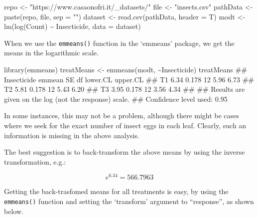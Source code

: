 \documentclass[a4paper,12pt,oneside]{book}
\newenvironment{Shaded}{\begin{snugshade}}{\end{snugshade}}
\newcommand{\SpecialCharTok}[1]{#1}
\newcommand{\StringTok}[1]{#1}
\newcommand{\DocumentationTok}[1]{#1}
\newcommand{\OtherTok}[1]{#1}
\newcommand{\FunctionTok}[1]{#1}
\newcommand{\AttributeTok}[1]{#1}
\newcommand{\NormalTok}[1]{#1}
\begin{document}
\begin{Shaded}
\begin{Highlighting}[]
\NormalTok{repo }\OtherTok{\textless{}{-}} \StringTok{"https://www.casaonofri.it/\_datasets/"}
\NormalTok{file }\OtherTok{\textless{}{-}} \StringTok{"insects.csv"}
\NormalTok{pathData }\OtherTok{\textless{}{-}} \FunctionTok{paste}\NormalTok{(repo, file, }\AttributeTok{sep =} \StringTok{""}\NormalTok{)}
\NormalTok{dataset }\OtherTok{\textless{}{-}} \FunctionTok{read.csv}\NormalTok{(pathData, }\AttributeTok{header =}\NormalTok{ T)}
\NormalTok{modt }\OtherTok{\textless{}{-}} \FunctionTok{lm}\NormalTok{(}\FunctionTok{log}\NormalTok{(Count) }\SpecialCharTok{\textasciitilde{}}\NormalTok{ Insecticide, }\AttributeTok{data =}\NormalTok{ dataset)}
\end{Highlighting}
\end{Shaded}

When we use the \texttt{emmeans()} function in the `emmeans' package, we get the means in the logarithmic scale.

\begin{Shaded}
\begin{Highlighting}[]
\FunctionTok{library}\NormalTok{(emmeans)}
\NormalTok{treatMeans }\OtherTok{\textless{}{-}} \FunctionTok{emmeans}\NormalTok{(modt, }\SpecialCharTok{\textasciitilde{}}\NormalTok{Insecticide)}
\NormalTok{treatMeans}
\DocumentationTok{\#\#  Insecticide emmean    SE df lower.CL upper.CL}
\DocumentationTok{\#\#  T1            6.34 0.178 12     5.96     6.73}
\DocumentationTok{\#\#  T2            5.81 0.178 12     5.43     6.20}
\DocumentationTok{\#\#  T3            3.95 0.178 12     3.56     4.34}
\DocumentationTok{\#\# }
\DocumentationTok{\#\# Results are given on the log (not the response) scale. }
\DocumentationTok{\#\# Confidence level used: 0.95}
\end{Highlighting}
\end{Shaded}

In some instances, this may not be a problem, although there might be cases where we seek for the exact number of insect eggs in each leaf. Clearly, such an information is missing in the above analysis.

The best suggestion is to back-transform the above means by using the inverse transformation, e.g.:

\[e^{6.34} = 566.7963\]

Getting the back-trasfomed means for all treatments is easy, by using the \texttt{emmeans()} function and setting the `transform' argument to ``response'', as shown below.
\end{document}

